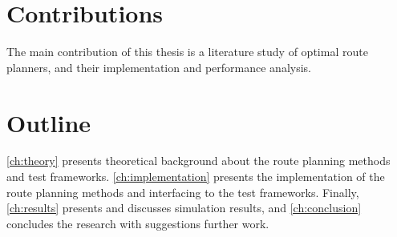 \section{Contributions}

The main contribution of this thesis is a literature study of optimal route planners, and their implementation and performance analysis.


\section{Outline}

\autoref{ch:theory} presents theoretical background about the route planning methods and test frameworks. \autoref{ch:implementation} presents the implementation of the route planning methods and interfacing to the test frameworks. Finally, \autoref{ch:results} presents and discusses simulation results, and \autoref{ch:conclusion} concludes the research with suggestions further work.